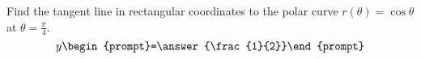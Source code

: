 \documentclass{ximera}
\author{Gregory Hartman \and Matthew Carr}
\begin{document}
\begin{exercise}






Find the tangent line in rectangular coordinates to the polar curve $r(\theta)=\cos\theta$ at $\theta=\frac{\pi}{4}$. 
 \[
y\begin{prompt}=\answer{\frac{1}{2}}\end{prompt}
 \]      
 
\end{exercise}
\end{document}
